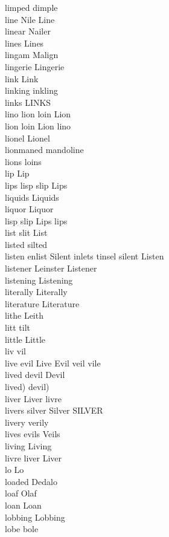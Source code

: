 limped dimple\\
line Nile Line\\
linear Nailer\\
lines Lines\\
lingam Malign\\
lingerie Lingerie\\
link Link\\
linking inkling\\
links LINKS\\
lino lion loin Lion\\
lion loin Lion lino\\
lionel Lionel\\
lionmaned mandoline\\
lions loins\\
lip Lip\\
lips lisp slip Lips\\
liquids Liquids\\
liquor Liquor\\
lisp slip Lips lips\\
list slit List\\
listed silted\\
listen enlist Silent inlets tinsel silent Listen\\
listener Leinster Listener\\
listening Listening\\
literally Literally\\
literature Literature\\
lithe Leith\\
litt tilt\\
little Little\\
liv vil\\
live evil Live Evil veil vile\\
lived devil Devil\\
lived) devil)\\
liver Liver livre\\
livers silver Silver SILVER\\
livery verily\\
lives evils Veils\\
living Living\\
livre liver Liver\\
lo Lo\\
loaded Dedalo\\
loaf Olaf\\
loan Loan\\
lobbing Lobbing\\
lobe bole\\
